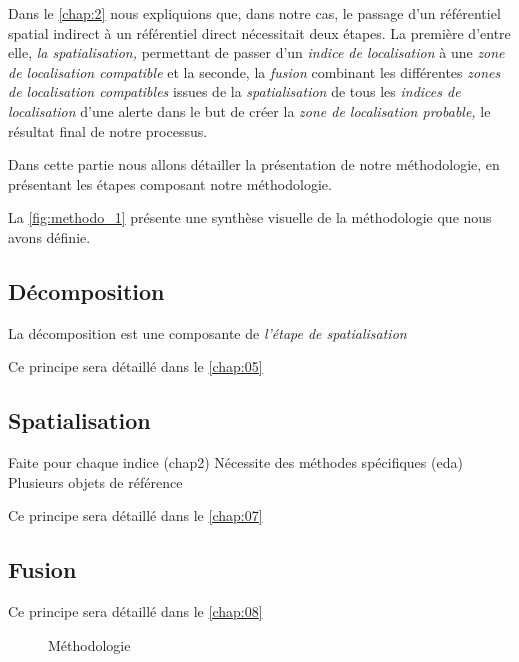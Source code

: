 Dans le \autoref{chap:2} nous expliquions que, dans notre cas, le
passage d'un référentiel spatial indirect à un référentiel direct
nécessitait deux étapes. La première d'entre elle, \emph{la
  spatialisation,} permettant de passer d'un \emph{indice de
  localisation} à une \emph{zone de localisation compatible} et la
seconde, la \emph{fusion} combinant les différentes \emph{zones de
  localisation compatibles} issues de la \emph{spatialisation} de tous
les \emph{indices de localisation} d'une alerte dans le but de créer
la \emph{zone de localisation probable,} \ie le résultat final de
notre processus.

Dans cette partie nous allons détailler la présentation de notre
méthodologie, en présentant les étapes composant notre méthodologie.

La \autoref{fig:methodo_1} présente une synthèse visuelle de la
méthodologie que nous avons définie.

\subsection{Décomposition}

La décomposition est une composante de \emph{l'étape de spatialisation}

Ce principe sera détaillé dans le \autoref{chap:05}

\subsection{Spatialisation}

Faite pour chaque indice (chap2)
Nécessite des méthodes spécifiques (eda)
Plusieurs objets de référence

Ce principe sera détaillé dans le \autoref{chap:07}

\subsection{Fusion}


Ce principe sera détaillé dans le \autoref{chap:08}




\begin{landscape}
  \begin{figure}[H]
    \centering
    
    \caption{Méthodologie}
    \label{fig:methodo_1}
  \end{figure}
\end{landscape}

